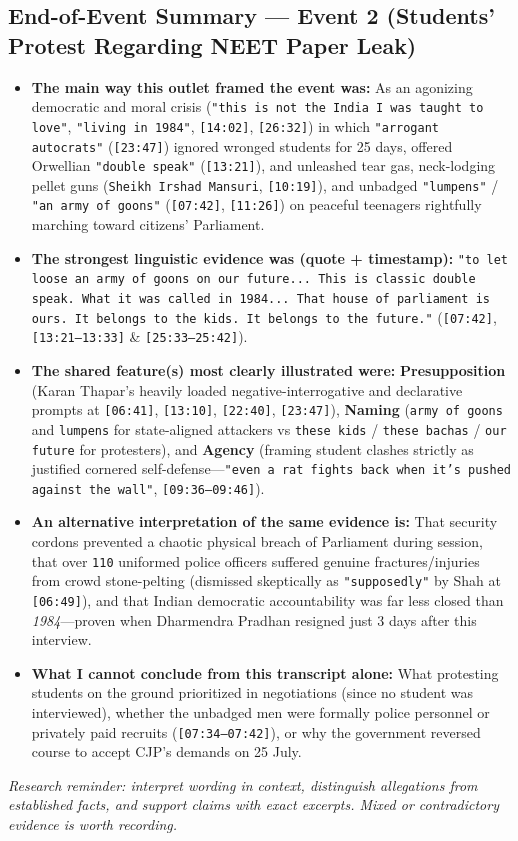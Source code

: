 \documentclass[10pt,a4paper]{article}
\begin{document}
\subsection*{End-of-Event Summary --- Event 2 (Students' Protest Regarding NEET Paper Leak)}
\begin{itemize}[leftmargin=1.5em, itemsep=3pt, topsep=4pt]
  \item \textbf{The main way this outlet framed the event was:} As an agonizing democratic and moral crisis (\texttt{"this is not the India I was taught to love"}, \texttt{"living in 1984"}, \texttt{[14:02]}, \texttt{[26:32]}) in which \texttt{"arrogant autocrats"} (\texttt{[23:47]}) ignored wronged students for 25 days, offered Orwellian \texttt{"double speak"} (\texttt{[13:21]}), and unleashed tear gas, neck-lodging pellet guns (\texttt{Sheikh Irshad Mansuri}, \texttt{[10:19]}), and unbadged \texttt{"lumpens"} / \texttt{"an army of goons"} (\texttt{[07:42]}, \texttt{[11:26]}) on peaceful teenagers rightfully marching toward citizens' Parliament.
  \item \textbf{The strongest linguistic evidence was (quote + timestamp):} \texttt{"to let loose an army of goons on our future... This is classic double speak. What it was called in 1984... That house of parliament is ours. It belongs to the kids. It belongs to the future."} (\texttt{[07:42]}, \texttt{[13:21--13:33]} \& \texttt{[25:33--25:42]}).
  \item \textbf{The shared feature(s) most clearly illustrated were:} \textbf{Presupposition} (Karan Thapar's heavily loaded negative-interrogative and declarative prompts at \texttt{[06:41]}, \texttt{[13:10]}, \texttt{[22:40]}, \texttt{[23:47]}), \textbf{Naming} (\texttt{army of goons} and \texttt{lumpens} for state-aligned attackers vs \texttt{these kids} / \texttt{these bachas} / \texttt{our future} for protesters), and \textbf{Agency} (framing student clashes strictly as justified cornered self-defense---\texttt{"even a rat fights back when it's pushed against the wall"}, \texttt{[09:36--09:46]}).
  \item \textbf{An alternative interpretation of the same evidence is:} That security cordons prevented a chaotic physical breach of Parliament during session, that over \texttt{110} uniformed police officers suffered genuine fractures/injuries from crowd stone-pelting (dismissed skeptically as \texttt{"supposedly"} by Shah at \texttt{[06:49]}), and that Indian democratic accountability was far less closed than \textit{1984}---proven when Dharmendra Pradhan resigned just 3 days after this interview.
  \item \textbf{What I cannot conclude from this transcript alone:} What protesting students on the ground prioritized in negotiations (since no student was interviewed), whether the unbadged men were formally police personnel or privately paid recruits (\texttt{[07:34--07:42]}), or why the government reversed course to accept CJP's demands on 25 July.
\end{itemize}
\textit{Research reminder: interpret wording in context, distinguish allegations from established facts, and support claims with exact excerpts. Mixed or contradictory evidence is worth recording.}
\end{document}
